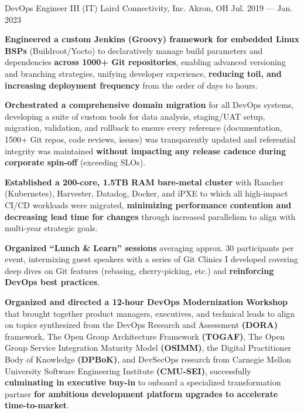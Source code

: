 \begin{cventries}
    \cventry
        { DevOps Engineer III (IT) }
        { Laird Connectivity, Inc. }
        { Akron, OH }
        { Jul. 2019 --- Jan. 2023 }
        {
            \begin{cvitems}
                \item{\textbf{Engineered a custom Jenkins (Groovy) framework for embedded Linux BSPs} (Buildroot/Yocto) to declaratively manage build parameters and dependencies \textbf{across 1000+ Git repositories}, enabling advanced versioning and branching strategies, unifying developer experience, \textbf{reducing toil, and increasing deployment frequency} from the order of days to hours.}
                \item{\textbf{Orchestrated a comprehensive domain migration} for all DevOps systems, developing a suite of custom tools for data analysis, staging/UAT setup, migration, validation, and rollback to ensure every reference (documentation, 1500+ Git repos, code reviews, issues) was transparently updated and referential integrity was maintained \textbf{without impacting any release cadence during corporate spin-off} (exceeding SLOs).}
                \item{\textbf{Established a 200-core, 1.5TB RAM bare-metal cluster} with Rancher (Kubernetes), Harvester, Datadog, Docker, and iPXE to which all high-impact CI/CD workloads were migrated, \textbf{minimizing performance contention and decreasing lead time for changes} through increased parallelism to align with multi-year strategic goals.}
                \item{\textbf{Organized ``Lunch \& Learn'' sessions} averaging approx. 30 participants per event, intermixing guest speakers with a series of Git Clinics I developed covering deep dives on Git features (rebasing, cherry-picking, etc.) and \textbf{reinforcing DevOps best practices}.}
                \item{\textbf{Organized and directed a 12-hour DevOps Modernization Workshop} that brought together product managers, executives, and technical leads to align on topics synthesized from the DevOps Research and Assessment \textbf{(DORA)} framework, The Open Group Architecture Framework \textbf{(TOGAF)}, The Open Group Service Integration Maturity Model \textbf{(OSIMM)}, the Digital Practitioner Body of Knowledge \textbf{(DPBoK)}, and DevSecOps research from Carnegie Mellon University Software Engineering Institute \textbf{(CMU-SEI)}, successfully \textbf{culminating in executive buy-in} to onboard a specialized transformation partner \textbf{for ambitious development platform upgrades to accelerate time-to-market}.}
            \end{cvitems}
        }
\end{cventries}
